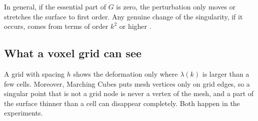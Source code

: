 \documentclass[12pt, a4paper]{article}
\theoremstyle{plain}
\theoremstyle{definition}
\theoremstyle{remark}
\theoremstyle{definition}
\begin{document}
In general, if the essential part of $G$ is zero, the perturbation only moves or stretches the surface to first order. 
Any genuine change of the singularity, if it occurs, comes from terms of order $k^2$ or higher \cite{greuel2007introduction}.

\subsection{What a voxel grid can see}

A grid with spacing $h$ shows the deformation only where $\lambda(k)$ is larger
than a few cells. Moreover, Marching Cubes puts mesh vertices only on grid edges,
so a singular point that is not a grid node is never a vertex of the mesh, and a
part of the surface thinner than a cell can disappear completely. Both happen in
the experiments.
\end{document}
